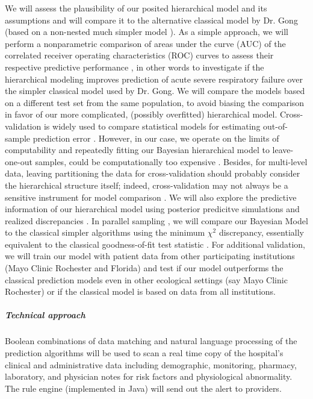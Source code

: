 \documentclass[11pt,notitlepage]{article}
\begin{document}
We will assess the plausibility of our posited hierarchical model and its assumptions \cite{Gelman_predictive_2000,GelmanMengStern1996} and will compare it to the alternative classical model by Dr. Gong (based on a non-nested much simpler model \cite{Herridge_12594312}). As a simple approach, we will perform a nonparametric comparison of areas under the curve (AUC) of the correlated receiver operating characteristics (ROC) curves \cite{DeLong_3203132} to assess their respective predictive performance \cite{Newcombe_22890972,Wu_20473190}, in other words to investigate if the hierarchical modeling improves prediction of acute severe respiratory failure over the simpler classical model used by Dr. Gong. We will compare the models based on a different test set from the same population, to avoid biasing the comparison in favor of our more complicated, (possibly overfitted) hierarchical model. Cross-validation is widely used to compare statistical models for estimating out-of-sample prediction error \cite{Vehtari_12396570}. However, in our case, we operate on the limits of computability and repeatedly fitting our Bayesian hierarchical model to leave-one-out samples, could be computationally too expensive \cite{Gelman_Aki_2014predictive}. Besides, for multi-level data, leaving partitioning the data for cross-validation should probably consider the hierarchical structure itself; indeed, cross-validation may not always be a sensitive instrument for model comparison \cite{wang_predictive_2014}. We will also explore the predictive information of our hierarchical model using posterior predicitve simulations and realized discrepancies \cite{Gelman_Aki_2014predictive,Gelman_predictive_2000,GelmanMengStern1996}. In parallel sampling \cite{Congdon_modelcomparison_2005}, we will compare our Bayesian Model to the classical simpler algorithms using the minimum $\chi^{2}$ discrepancy, essentially equivalent to the classical goodness-of-fit test statistic \cite{GelmanMengStern1996}. For additional validation, we will train our model with patient data from other participating institutions (Mayo Clinic Rochester and Florida) and test if our model outperforms the classical prediction models even in other ecological settings (say Mayo Clinic Rochester) or if the classical model is based on data from all institutions.

\subparagraph*{Technical approach}
Boolean combinations of data matching and natural language processing of the prediction algorithms will be used to scan a real time copy of the hospital's clinical and administrative data including demographic, monitoring, pharmacy, laboratory, and physician notes for risk factors and physiological abnormality. The rule engine (implemented in Java) will send out the alert to providers.
\end{document}
